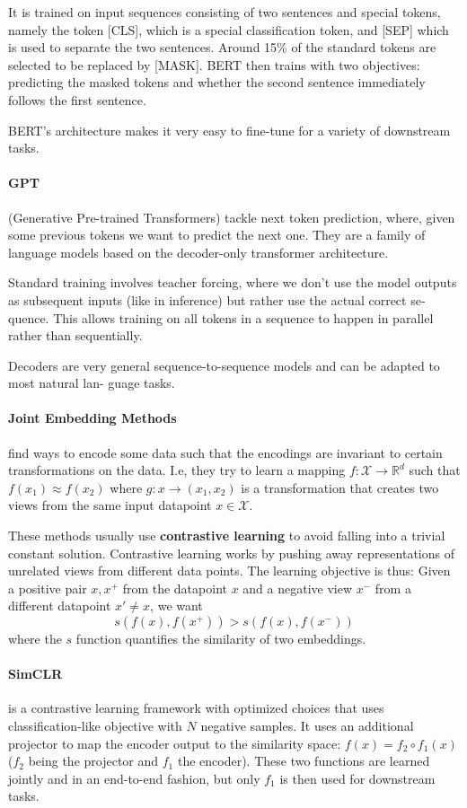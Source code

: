 \documentclass{article}
\newcommand{\R}{\mathbb{R}}
\begin{document}
It is trained on input sequences consisting of two sentences and special tokens, namely the token [CLS], which is a special classification token, and [SEP] which is used to separate the two sentences.
Around 15\% of the standard tokens are selected to be replaced by [MASK].
BERT then trains with two objectives: predicting the masked tokens and whether the second sentence immediately follows the first sentence.

BERT's architecture makes it very easy to fine-tune for a variety of downstream tasks.

\paragraph{GPT} (Generative Pre-trained Transformers) tackle next token prediction, where, given some previous tokens we want to predict the next one.
They are a family of language models based on the decoder-only transformer architecture.

Standard training involves teacher forcing, where we don’t use the model outputs as subsequent inputs (like in inference) but rather use the actual correct se- quence.
This allows training on all tokens in a sequence to happen in parallel rather than sequentially.

Decoders are very general sequence-to-sequence models and can be adapted to most natural lan- guage tasks.

\paragraph{Joint Embedding Methods} find ways to encode some data such that the encodings are invariant to certain transformations on the data.
I.e, they try to learn a mapping $f: \mathcal{X} \to \R^d$ such that $f(x_1) \approx f(x_2)$ where $g : x \to (x_1, x_2)$ is a transformation that creates two views from the same input datapoint $x \in \mathcal{X}$.

These methods usually use \textbf{contrastive learning} to avoid falling into a trivial constant solution.
Contrastive learning works by pushing away representations of unrelated views from different data points.
The learning objective is thus:
Given a positive pair $x, x^+$ from the datapoint $x$ and a negative view $x^-$ from a different datapoint $x' \neq x$, we want
$$
s(f(x), f(x^+)) > s(f(x), f(x^-))
$$
where the $s$ function quantifies the similarity of two embeddings.

\paragraph{SimCLR} is a contrastive learning framework with optimized choices that uses classification-like objective with $N$ negative samples.
It uses an additional projector to map the encoder output to the similarity space: $f(x) = f_2 \circ f_1 (x)$ ($f_2$ being the projector and $f_1$ the encoder).
These two functions are learned jointly and in an end-to-end fashion, but only $f_1$ is then used for downstream tasks.
\end{document}
